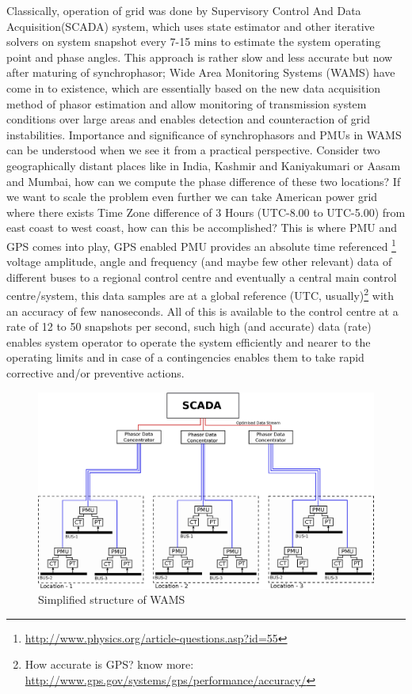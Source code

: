 Classically, operation of grid was done by Supervisory Control And Data Acquisition(SCADA) system, which uses state estimator and other iterative solvers on system snapshot every 7-15 mins to estimate the system operating point and phase angles. This approach is rather slow and less accurate but now after maturing of synchrophasor; Wide Area Monitoring Systems (WAMS) have come in to existence, which are essentially based on the new data acquisition method of phasor estimation and allow monitoring of transmission system conditions over large areas and enables detection and counteraction of grid instabilities. Importance and significance of synchrophasors and PMUs in WAMS can be understood when we see it from a practical perspective. Consider two geographically distant places like in India, Kashmir and Kaniyakumari or Aasam and Mumbai, how can we compute the phase difference of these two locations? If we want to scale the problem even further we can take American power grid where there exists Time Zone difference of 3 Hours (UTC-8.00 to UTC-5.00) from east coast to west coast, how can this be accomplished? This is where PMU and GPS comes into play, GPS enabled PMU provides an absolute time referenced \footnote{\url{http://www.physics.org/article-questions.asp?id=55}} voltage amplitude, angle and frequency (and maybe few other relevant) data of different buses to a regional control centre and eventually a central main control centre/system, this data samples are at a global reference (UTC, usually)\footnote{How accurate is GPS? know more: \url{http://www.gps.gov/systems/gps/performance/accuracy/}} with an accuracy of few nanoseconds. All of this is available to the control centre at a rate of 12 to 50 snapshots per second, such high (and accurate) data (rate) enables system operator to operate the system efficiently and nearer to the operating limits and in case of a contingencies enables them to take rapid corrective and/or preventive actions.
\begin{figure}
	\includegraphics[width=\textwidth]{fig/wams.eps}
	\caption{Simplified structure of WAMS}
	\label{fig:wams}
\end{figure}

